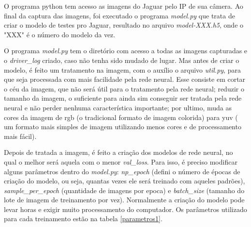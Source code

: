 	\begin{figure}[H]
		\centering
\end{figure}

O programa python tem acesso as imagens do Jaguar pelo IP de sua câmera. Ao final da captura das imagens, foi executado o programa \textit{model.py} que trata de criar o modelo de testes pro Jaguar, resultado no arquivo \textit{model-XXX.h5}, onde o "XXX" é o número do modelo da vez.

O programa \textit{model.py} tem o diretório com acesso a todas as imagens capturadas e o \textit{driver\_log} criado, caso não tenha sido mudado de lugar. Mas antes de criar o modelo, é feito um tratamento na imagem, com o auxílio o arquivo \textit{util.py}, para que seja processada com mais facilidade pela rede neural. Esse consiste em cortar o céu da imagem, que não será útil para o tratamento pela rede neural; reduzir o tamanho da imagem, o suficiente para ainda sim conseguir ser tratada pela rede neural e não perder nenhuma característica importante; por ultimo, muda as cores da imagem de rgb (o tradicional formato de imagem colorida) para yuv ( um formato mais simples de imagem utilizando menos cores e de processamento mais fácil).

Depois de tratada a imagem, é feito a criação dos modelos de rede neural, no qual o melhor será aquela com o menor \textit{val\_loss}. Para isso, é preciso modificar alguns parâmetros dentro do \textit{model.py}: \textit{np\_epoch} (defini o número de épocas de criação do modelo, ou seja, quantas vezes ele será treinado com aqueles padrões), \textit{sample\_per\_epoch} (quantidade de imagens por epoca) e \textit{batch\_size} (tamanho do lote de imagem de treinamento por vez). Normalmente a criação do modelo pode levar horas e exigir muito processamento do computador. Os parâmetros utilizado para cada treinamento estão na tabela \ref{parametros1}.

